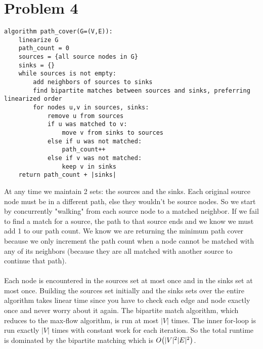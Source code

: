 \documentclass[11pt]{article}
\let\origleft\left
\let\origright\right
\renewcommand{\left}{\mathopen{}\mathclose\bgroup\origleft}
\renewcommand{\right}{\aftergroup\egroup\origright}
\newcommand{\p}[1]{\left(#1\right)}
\newcommand{\BigOh}[1]{O\p{#1}}
\begin{document}
\newpage
\section*{Problem 4}
\begin{verbatim}
algorithm path_cover(G=(V,E)):
    linearize G
    path_count = 0
    sources = {all source nodes in G}
    sinks = {}
    while sources is not empty:
        add neighbors of sources to sinks
        find bipartite matches between sources and sinks, preferring linearized order
        for nodes u,v in sources, sinks:
            remove u from sources
            if u was matched to v:
                move v from sinks to sources
            else if u was not matched:
                path_count++
            else if v was not matched:
                keep v in sinks
    return path_count + |sinks|
\end{verbatim}
At any time we maintain 2 sets: the sources and the sinks. Each original source node must be in a different path, else they wouldn't be source nodes. So we start by concurrently "walking" from each source node to a matched neighbor. If we fail to find a match for a source, the path to that source ends and we know we must add 1 to our path count. We know we are returning the minimum path cover because we only increment the path count when a node cannot be matched with any of its neighbors (because they are all matched with another source to continue that path). \\\\
Each node is encountered in the sources set at most once and in the sinks set at most once. Building the sources set initially and the sinks sets over the entire algorithm takes linear time since you have to check each edge and node exactly once and never worry about it again. The bipartite match algorithm, which reduces to the max-flow algorithm, is run at most $|V|$ times. The inner for-loop is run exactly $|V|$ times with constant work for each iteration. So the total runtime is dominated by the bipartite matching which is $\BigOh{|V|^2|E|^2}$.

\newpage
\end{document}
